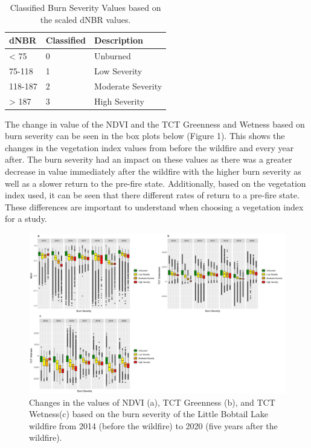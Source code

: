 \documentclass[
]{book}
\begin{document}
\begin{table}

\caption{\label{tab:13-murray-case-study-table-1}Classified Burn Severity Values based on the scaled dNBR values.}
\centering
\begin{tabular}[t]{l|l|l}
\hline
dNBR & Classified & Description\\
\hline
< 75 & 0 & Unburned\\
\hline
75-118 & 1 & Low Severity\\
\hline
118-187 & 2 & Moderate Severity\\
\hline
> 187 & 3 & High Severity\\
\hline
\end{tabular}
\end{table}

The change in value of the NDVI and the TCT Greenness and Wetness based on burn severity can be seen in the box plots below (Figure 1). This shows the changes in the vegetation index values from before the wildfire and every year after. The burn severity had an impact on these values as there was a greater decrease in value immediately after the wildfire with the higher burn severity as well as a slower return to the pre-fire state. Additionally, based on the vegetation index used, it can be seen that there different rates of return to a pre-fire state. These differences are important to understand when choosing a vegetation index for a study.

\begin{figure}
\includegraphics[width=66.67in]{images/13-VIPlots} \caption{Changes in the values of NDVI (a), TCT Greenness (b), and TCT Wetness(c) based on the burn severity of the Little Bobtail Lake wildfire from 2014 (before the wildfire) to 2020 (five years after the wildfire).}\label{fig:unnamed-chunk-35}
\end{figure}
\end{document}
